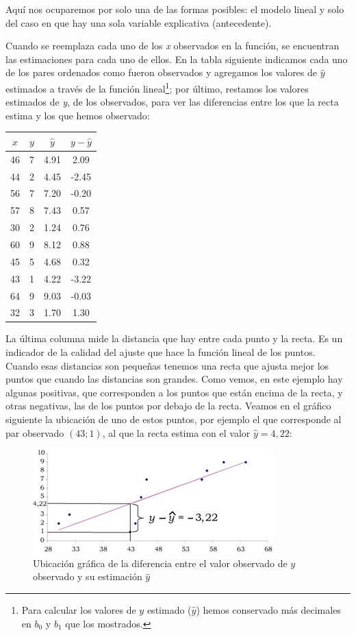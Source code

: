 \documentclass[]{book}
\let\rmarkdownfootnote\footnote%
\def\footnote{\protect\rmarkdownfootnote}
\begin{document}
Aquí nos ocuparemos por solo una de las formas posibles: el modelo lineal y solo del caso en que hay una sola variable explicativa (antecedente).

Cuando se reemplaza cada uno de los \emph{x} observados en la función, se
encuentran las estimaciones para cada uno de ellos. En la tabla
siguiente indicamos cada uno de los pares ordenados como fueron
observados y agregamos los valores de \(\widehat{y}\) estimados a través
de la función lineal\footnote{Para calcular los valores de \(y\) estimado (\(\widehat{y}\)) hemos conservado más decimales en \(b_0\) y \(b_1\) que los mostrados.}; por último, restamos los valores estimados de
\emph{y}, de los observados, para ver las diferencias entre los que la recta
estima y los que hemos observado:

\begin{longtable}[]{@{}cccc@{}}
\toprule
\(x\) & \(y\) & \(\widehat{y}\) & \(y - \widehat{y}\)\tabularnewline
\midrule
\endhead
46 & 7 & 4.91 & 2.09\tabularnewline
44 & 2 & 4.45 & -2.45\tabularnewline
56 & 7 & 7.20 & -0.20\tabularnewline
57 & 8 & 7.43 & 0.57\tabularnewline
30 & 2 & 1.24 & 0.76\tabularnewline
60 & 9 & 8.12 & 0.88\tabularnewline
45 & 5 & 4.68 & 0.32\tabularnewline
43 & 1 & 4.22 & -3.22\tabularnewline
64 & 9 & 9.03 & -0.03\tabularnewline
32 & 3 & 1.70 & 1.30\tabularnewline
\bottomrule
\end{longtable}

La última columna mide la distancia que hay entre cada punto y la recta.
Es un indicador de la calidad del ajuste que hace la función lineal de
los puntos. Cuando esas distancias son pequeñas tenemos una recta que
ajusta mejor los puntos que cuando las distancias son grandes. Como
vemos, en este ejemplo hay algunas positivas, que corresponden a los
puntos que están encima de la recta, y otras negativas, las de los
puntos por debajo de la recta. Veamos en el gráfico siguiente la
ubicación de uno de estos puntos, por ejemplo el que corresponde al par
observado \((43; 1)\), al que la recta estima con el valor \(\widehat{y} = 4,22\):

\begin{figure}

{\centering \includegraphics{imagenes/grafico13} 

}

\caption{Ubicación gráfica de la diferencia entre el valor observado de $y$ observado y su estimación $\widehat{y}$}\label{fig:unnamed-chunk-167}
\end{figure}
\end{document}
